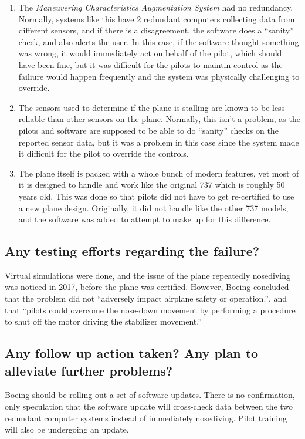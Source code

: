 \documentclass[letterpaper]{article}
\begin{document}
\begin{enumerate}
	\item The \textit{Maneuvering Characteristics Augmentation System} had no redundancy.
	      Normally, systems like this have 2 redundant computers collecting data from different sensors,
	      and if there is a disagreement, the software does a ``sanity'' check, and also alerts the user.
	      In this case, if the software thought something was wrong, it would immediately act on behalf of the pilot,
	      which should have been fine, but it was difficult for the pilots to maintin control as the failiure would happen
	      frequently and the system was physically challenging to override.\cite{verge}

	\item The sensors used to determine if the plane is stalling are known to be less reliable than other sensors on the plane.
	      Normally, this isn't a problem, as the pilots and software are supposed to be able to do ``sanity'' checks
	      on the reported sensor data, but it was a problem in this case since the system made it difficult for the pilot to
	      override the controls.\cite{ieeespectrum}

	\item The plane itself is packed with a whole bunch of modern features, yet most of it is designed to handle and work like the
	      original 737 which is roughly 50 years old. This was done so that pilots did not have to get re-certified to use a new plane design.
	      Originally, it did not handle like the other 737 models, and the software was added to attempt to make up for this difference.\cite{verge}

\end{enumerate}


\subsection*{Any testing efforts regarding the failure?}

Virtual simulations were done, and the issue of the plane repeatedly nosediving was noticed in 2017, before the plane was certified.
However, Boeing concluded that the problem did not ``adversely impact airplane safety or operation.'', and that
``pilots could overcome the nose-down movement by performing a procedure to shut off the motor driving the stabilizer movement.''\cite{bloomberg}\cite{goggin_2019}


\subsection*{Any follow up action taken? Any plan to alleviate further problems?}
Boeing should be rolling out a set of software updates\cite{ieeespectrum}\cite{bloomberg}.
There is no confirmation, only speculation that the software update will cross-check data between the two redundant computer systems
instead of immediately nosediving.\cite{ieeespectrum}
Pilot training will also be undergoing an update.\cite{cnn}


\nocite{*}
\printbibliography
\end{document}
